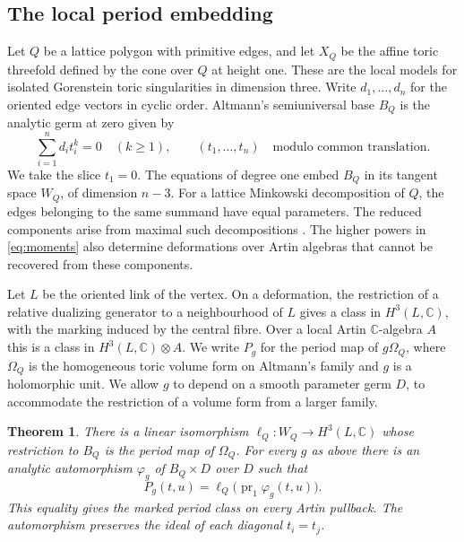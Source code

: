 \documentclass[11pt]{amsart}
\newtheorem{theorem}{Theorem}[section]
\theoremstyle{definition}
\theoremstyle{remark}
\newcommand{\C}{\mathbb C}
\begin{document}
\subsection*{The local period embedding}
Let $Q$ be a lattice polygon with primitive edges, and let $X_Q$ be
the affine toric threefold defined by the cone over $Q$ at height one.
These are the local models for isolated Gorenstein toric singularities
in dimension three. Write $d_1,\ldots,d_n$ for the oriented edge
vectors in cyclic order. Altmann's semiuniversal base $B_Q$ is the
analytic germ at zero given by
\begin{equation}\label{eq:moments}
 \sum_{i=1}^n d_i t_i^k=0 \quad(k\geq 1),\qquad
 (t_1,\ldots,t_n)\quad\text{modulo common translation}.
\end{equation}
We take the slice $t_1=0$. The equations of degree one embed $B_Q$ in
its tangent space $W_Q$, of dimension $n-3$. For a lattice Minkowski
decomposition of $Q$, the edges belonging to the same summand have
equal parameters. The reduced components arise from maximal such
decompositions \cite[\S\S2,8]{Alt}. The higher powers in
\eqref{eq:moments} also determine deformations over Artin algebras
that cannot be recovered from these components.

Let $L$ be the oriented link of the vertex. On a deformation, the
restriction of a relative dualizing generator to a neighbourhood of
$L$ gives a class in $H^3(L,\C)$, with the marking induced by the
central fibre. Over a local Artin $\C$-algebra $A$ this is a class in
$H^3(L,\C)\otimes A$. We write $P_g$ for the period map of
$g\Omega_Q$, where $\Omega_Q$ is the homogeneous toric volume form
on Altmann's family and $g$ is a holomorphic unit. We allow $g$ to
depend on a smooth parameter germ $D$, to accommodate the restriction
of a volume form from a larger family.

\begin{theorem}\label{thm:local}
There is a linear isomorphism $\ell_Q:W_Q\to H^3(L,\C)$ whose
restriction to $B_Q$ is the period map of $\Omega_Q$.
For every $g$ as above there is an analytic automorphism
$\varphi_g$ of $B_Q\times D$ over $D$ such that
\[
 P_g(t,u)=\ell_Q\bigl(\operatorname{pr}_1\varphi_g(t,u)\bigr).
\]
This equality gives the marked period class on every Artin pullback.
The automorphism preserves the ideal of each diagonal $t_i=t_j$.
\end{theorem}
\end{document}
